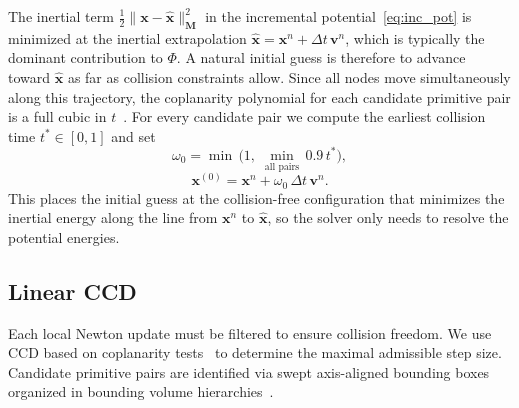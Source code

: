 \documentclass[acmtog,anonymous,review]{acmart}
\begin{document}
The inertial term
$\tfrac{1}{2}\|\mathbf{x}-\hat{\mathbf{x}}\|_{\mathbf{M}}^2$ in
the incremental potential~\eqref{eq:inc_pot} is minimized at the inertial
extrapolation
$\hat{\mathbf{x}}=\mathbf{x}^n+\Delta t\,\mathbf{v}^n$, which is
typically the dominant contribution to $\Phi$. A natural initial
guess is therefore to advance toward $\hat{\mathbf{x}}$ as far as
collision constraints allow. Since all nodes move simultaneously
along this trajectory, the coplanarity polynomial for each candidate
primitive pair is a full cubic in
$t$~\cite{bridson2002cloth}. For every candidate pair we compute the
earliest collision time $t^*\in[0,1]$ and set
\begin{equation}
\label{eq:omega0}
\omega_0
=
\min \,\!\bigl(1,\;
\min_{\text{all pairs}}\,0.9\,t^*\bigr),
\end{equation}
\begin{equation}
\label{eq:ccd_guess}
\mathbf{x}^{(0)}
=
\mathbf{x}^n+\omega_0\,\Delta t\,\mathbf{v}^n.
\end{equation}
This places the initial guess at the collision-free configuration
that minimizes the inertial energy along the line from
$\mathbf{x}^n$ to $\hat{\mathbf{x}}$, so the solver only needs to
resolve the potential energies.

\subsection{Linear CCD}
\label{sec:linear_ccd}

Each local Newton update must be filtered to ensure collision freedom.
We use CCD based on coplanarity
tests~\cite{bridson2002cloth} to determine the maximal admissible
step size.  Candidate primitive pairs are identified via swept
axis-aligned bounding boxes organized in bounding volume
hierarchies~\cite[Section~4.2]{ericson2004collision}.
\end{document}
